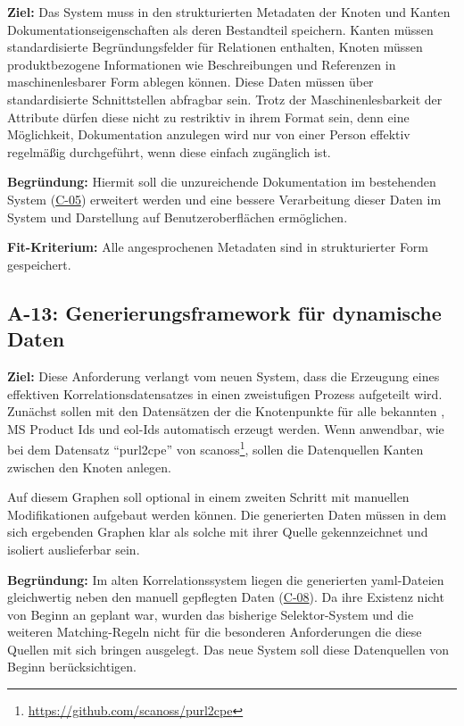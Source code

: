 \textbf{Ziel:}
Das System muss in den strukturierten Metadaten der Knoten und Kanten Dokumentationseigenschaften als deren Bestandteil speichern.
Kanten müssen standardisierte Begründungsfelder für Relationen enthalten, Knoten müssen produktbezogene Informationen wie Beschreibungen und Referenzen in maschinenlesbarer Form ablegen können.
Diese Daten müssen über standardisierte Schnittstellen abfragbar sein.
Trotz der Maschinenlesbarkeit der Attribute dürfen diese nicht zu restriktiv in ihrem Format sein, denn eine Möglichkeit, Dokumentation anzulegen wird nur von einer Person effektiv regelmäßig durchgeführt, wenn diese einfach zugänglich ist.

\textbf{Begründung:}
Hiermit soll die unzureichende Dokumentation im bestehenden System (\hyperref[subsec:c-05-reason-not-good-enough]{C-05}) erweitert werden und eine bessere Verarbeitung dieser Daten im System und Darstellung auf Benutzeroberflächen ermöglichen.

\textbf{Fit-Kriterium:}
Alle angesprochenen Metadaten sind in strukturierter Form gespeichert.

\subsection{A-13: Generierungsframework für dynamische Daten}\label{subsec:req-generated-data}

\textbf{Ziel:}
Diese Anforderung verlangt vom neuen System, dass die Erzeugung eines effektiven Korrelationsdatensatzes in einen zweistufigen Prozess aufgeteilt wird.
Zunächst sollen mit den Datensätzen der \metaeffektsp die Knotenpunkte für alle bekannten , MS Product Ids und \acrshort{eol}-Ids automatisch erzeugt werden.
Wenn anwendbar, wie bei dem Datensatz \enquote{purl2cpe} von scanoss\footnote{\url{https://github.com/scanoss/purl2cpe}}, sollen die Datenquellen Kanten zwischen den Knoten anlegen.

Auf diesem Graphen soll optional in einem zweiten Schritt mit manuellen Modifikationen aufgebaut werden können.
Die generierten Daten müssen in dem sich ergebenden Graphen klar als solche mit ihrer Quelle gekennzeichnet und isoliert auslieferbar sein.

\textbf{Begründung:}
Im alten Korrelationssystem liegen die generierten \acrshort{yaml}-Dateien gleichwertig neben den manuell gepflegten Daten (\hyperref[subsec:c-08-generated-correlation-data]{C-08}).
Da ihre Existenz nicht von Beginn an geplant war, wurden das bisherige Selektor-System und die weiteren Matching-Regeln nicht für die besonderen Anforderungen die diese Quellen mit sich bringen ausgelegt.
Das neue System soll diese Datenquellen von Beginn berücksichtigen.

